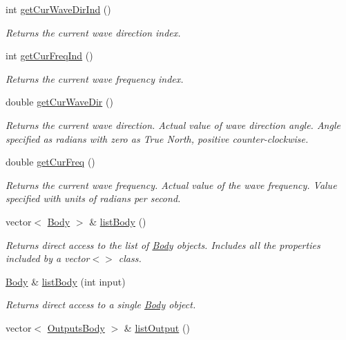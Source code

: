 \begin{DoxyCompactItemize}
int \hyperlink{class_system_aff94e0e384f1c55cccfa0f0238e445b8}{get\-Cur\-Wave\-Dir\-Ind} ()
\begin{DoxyCompactList}\small\item\em Returns the current wave direction index. \end{DoxyCompactList}\item 
int \hyperlink{class_system_ae348a554ad912c084343e96c3a7b8647}{get\-Cur\-Freq\-Ind} ()
\begin{DoxyCompactList}\small\item\em Returns the current wave frequency index. \end{DoxyCompactList}\item 
double \hyperlink{class_system_aea8c3cb08e84051a4325c06c5a7185fa}{get\-Cur\-Wave\-Dir} ()
\begin{DoxyCompactList}\small\item\em Returns the current wave direction. Actual value of wave direction angle. Angle specified as radians with zero as True North, positive counter-\/clockwise. \end{DoxyCompactList}\item 
double \hyperlink{class_system_ac4dec1ad6e8745d87f18dfb91bbd8f6b}{get\-Cur\-Freq} ()
\begin{DoxyCompactList}\small\item\em Returns the current wave frequency. Actual value of the wave frequency. Value specified with units of radians per second. \end{DoxyCompactList}\item 
vector$<$ \hyperlink{class_body}{Body} $>$ \& \hyperlink{class_system_adf2b36b23ce4bca11639f8dd8bb48918}{list\-Body} ()
\begin{DoxyCompactList}\small\item\em Returns direct access to the list of \hyperlink{class_body}{Body} objects. Includes all the properties included by a vector$<$$>$ class. \end{DoxyCompactList}\item 
\hyperlink{class_body}{Body} \& \hyperlink{class_system_af91978b3309a287948fc55773c4193e5}{list\-Body} (int input)
\begin{DoxyCompactList}\small\item\em Returns direct access to a single \hyperlink{class_body}{Body} object. \end{DoxyCompactList}\item 
vector$<$ \hyperlink{class_outputs_body}{Outputs\-Body} $>$ \& \hyperlink{class_system_ad2c5c4c5be9ed1b30651a267df67c466}{list\-Output} ()

\end{DoxyCompactItemize}
